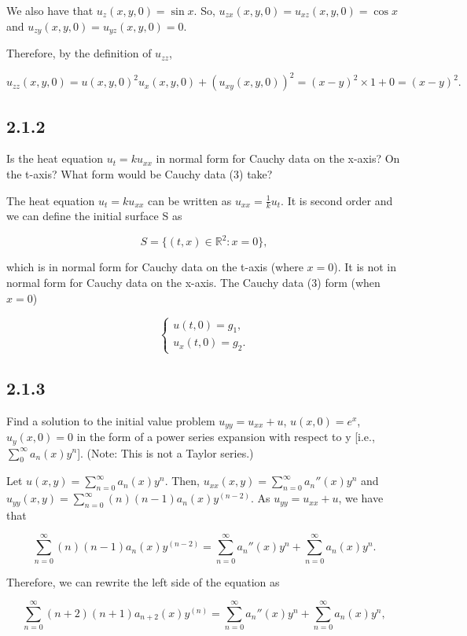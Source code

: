 \documentclass{article}
\begin{document}
\begin{flushleft}
We also have that $u_z ( x,y,0) = \sin x $. So, $u_{zx} ( x,y,0) = u_{xz} ( x,y,0) = \cos x $ and
$u_{zy} ( x,y,0) = u_{yz} ( x,y,0) = 0 $. 

Therefore, by the definition of $u_{zz}$,
\begin{center}
$u_{zz}(x,y,0)={u(x,y,0)}^2u_x(x,y,0) +(u_{xy}(x,y,0))^2=(x-y)^2\times 1 + 0 = (x-y)^2.$
\end{center}
\subsection{\textbf{2.1.2}} Is the heat equation $u_t = ku_{xx}$ in normal form for Cauchy data on the x-axis? On the t-axis? What form would be Cauchy data (3) take?

The heat equation $u_t=ku_{xx}$ can be written as $u_{xx}=\frac{1}{k}u_t$. It is second order and we can define the initial surface S as

$$S= \{(t,x)\in \mathbb R^2 : x=0\},$$

which is in normal form for Cauchy data on the t-axis (where $x=0$). It is not in normal form for Cauchy data on the x-axis. The Cauchy data (3) form (when $x=0$)

\[ \begin{cases} 
      u(t,0)=g_1, \\
      u_x(t,0)=g_2.
   \end{cases}
\]

\subsection{\textbf{2.1.3}} Find a solution to the initial value problem $u_{yy}=u_{xx}+u$, $u(x,0)=e^x$, $u_y(x,0)=0$ in the form of a power series expansion with respect to y [i.e., $\sum_0^\infty a_n(x)y^n$]. (Note: This is not a Taylor series.)

Let $u(x,y)= \sum_{n=0}^{\infty}a_n(x)y^n$. Then, $u_{xx}(x,y)= \sum_{n=0}^{\infty}a_n''(x)y^n$ and $u_{yy}(x,y)= \sum_{n=0}^{\infty}(n)(n-1)a_n(x)y^{(n-2)}$. As $u_{yy}=u_{xx}+u$, we have that

$$\sum_{n=0}^{\infty}(n)(n-1)a_n(x)y^{(n-2)} =  \sum_{n=0}^{\infty}a_n''(x)y^n +  \sum_{n=0}^{\infty}a_n(x)y^n.$$

Therefore, we can rewrite the left side of the equation as

$$\sum_{n=0}^{\infty}(n+2)(n+1)a_{n+2}(x)y^{(n)} =  \sum_{n=0}^{\infty}a_n''(x)y^n +  \sum_{n=0}^{\infty}a_n(x)y^n,$$


\end{flushleft}
\end{document}
